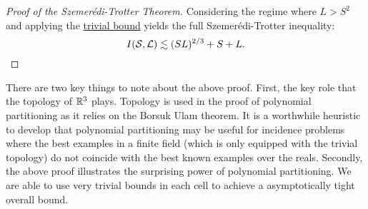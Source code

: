\begin{proof}[Proof of the Szemerédi-Trotter Theorem]
Considering the regime where $L > S^2$ and applying the \hyperref[thm:trivial-ST-bounds]{trivial bound} yields the full Szemerédi-Trotter inequality:
\[
    I(\mathcal S, \mathcal L) \lesssim (SL)^{2/3} + S + L. 
\]
\end{proof}

There are two key things to note about the above proof. First, the key role that the topology of $\mathbb R^3$ plays. Topology is used in the proof of polynomial partitioning as
it relies on the Borsuk Ulam theorem. It is a worthwhile heuristic to develop that polynomial partitioning may be useful for incidence problems
where the best examples in a finite field (which is only equipped with the trivial topology) do not coincide with the best known examples over the reals.
Secondly, the above proof illustrates the surprising power of polynomial partitioning. We are able to use very trivial bounds in each cell to achieve
a asymptotically tight overall bound. 
